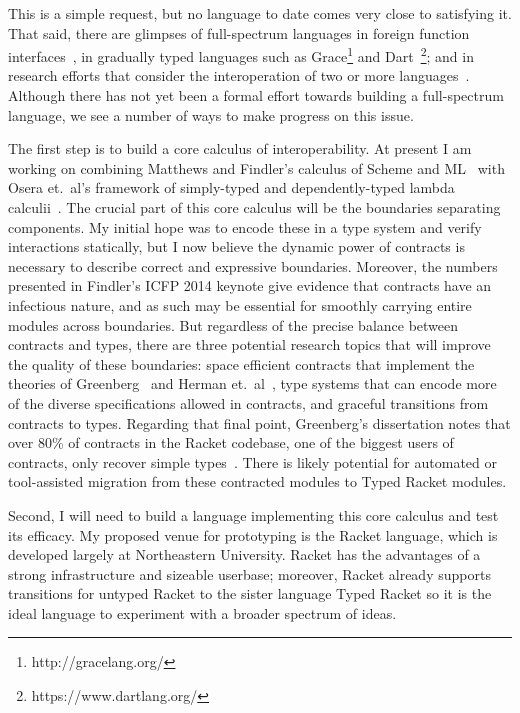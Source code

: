 \documentclass{article}
\begin{document}
This is a simple request, but no language to date comes very close to satisfying it.
That said, there are glimpses of full-spectrum languages in foreign function interfaces~\cite{furr2005checking}, in gradually typed languages such as Grace\footnote{http://gracelang.org/} and Dart~\footnote{https://www.dartlang.org/}; and in research efforts that consider the interoperation of two or more languages~\cite{osera, gray2005fine, anand2014towards, perconti2014verifying}.
Although there has not yet been a formal effort towards building a full-spectrum language, we see a number of ways to make progress on this issue.

The first step is to build a core calculus of interoperability.
At present I am working on combining Matthews and Findler's calculus of Scheme and ML~\cite{matthews2007operational} with Osera et.~al's framework of simply-typed and dependently-typed lambda calculii~\cite{osera}.
The crucial part of this core calculus will be the boundaries separating components.
My initial hope was to encode these in a type system and verify interactions statically, but I now believe the dynamic power of contracts is necessary to describe correct and expressive boundaries.
Moreover, the numbers presented in Findler's ICFP 2014 keynote give evidence that contracts have an infectious nature, and as such may be essential for smoothly carrying entire modules across boundaries.
But regardless of the precise balance between contracts and types, there are three potential research topics that will improve the quality of these boundaries: space efficient contracts that implement the theories of Greenberg~\cite{greenberg2015space} and Herman et.~al~\cite{herman2010space}, type systems that can encode more of the diverse specifications allowed in contracts, and graceful transitions from contracts to types.
Regarding that final point, Greenberg's dissertation notes that over 80\% of contracts in the Racket codebase, one of the biggest users of contracts, only recover simple types~\cite{greenberg2013manifest}.
There is likely potential for automated or tool-assisted migration from these contracted modules to Typed Racket modules.

Second, I will need to build a language implementing this core calculus and test its efficacy.
My proposed venue for prototyping is the Racket language, which is developed largely at Northeastern University.
Racket has the advantages of a strong infrastructure and sizeable userbase; moreover, Racket already supports transitions for untyped Racket to the sister language Typed Racket so it is the ideal language to experiment with a broader spectrum of ideas.
\end{document}
